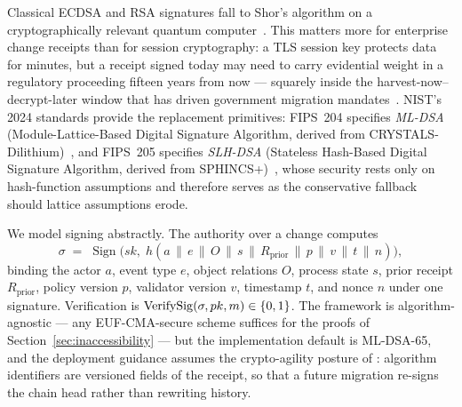 Classical ECDSA and RSA signatures fall to Shor's algorithm on a
cryptographically relevant quantum computer~\cite{bernstein_lange_pqc_2017}.
This matters more for enterprise change receipts than for session
cryptography: a TLS session key protects data for minutes, but a receipt
signed today may need to carry evidential weight in a regulatory proceeding
fifteen years from now --- squarely inside the harvest-now--decrypt-later
window that has driven government migration
mandates~\cite{presman_govt_pqc_2024}. NIST's 2024 standards provide the
replacement primitives: FIPS~204 specifies \emph{ML-DSA}
(Module-Lattice-Based Digital Signature Algorithm, derived from
CRYSTALS-Dilithium)~\cite{nist_fips_204_2024}, and FIPS~205 specifies
\emph{SLH-DSA} (Stateless Hash-Based Digital Signature Algorithm, derived from
SPHINCS+)~\cite{nist_fips_205_2024}, whose security rests only on hash-function
assumptions and therefore serves as the conservative fallback should lattice
assumptions erode.

We model signing abstractly. The authority over a change computes
\[
  \sigma \;=\; \operatorname{Sign}\bigl(sk,\;
  h(a \,\|\, e \,\|\, O \,\|\, s \,\|\, R_{\mathrm{prior}} \,\|\, p \,\|\, v
  \,\|\, t \,\|\, n)\bigr),
\]
binding the actor $a$, event type $e$, object relations $O$, process state $s$,
prior receipt $R_{\mathrm{prior}}$, policy version $p$, validator version $v$,
timestamp $t$, and nonce $n$ under one signature. Verification is
$\operatorname{VerifySig}(\sigma, pk, m) \in \{0,1\}$. The framework is algorithm-agnostic
--- any EUF-CMA-secure scheme suffices for the proofs of
Section~\ref{sec:inaccessibility} --- but the implementation default is
ML-DSA-65, and the deployment guidance assumes the crypto-agility posture of
\cite{crypto_agility_maturity_2022}: algorithm identifiers are versioned fields
of the receipt, so that a future migration re-signs the chain head rather than
rewriting history.
